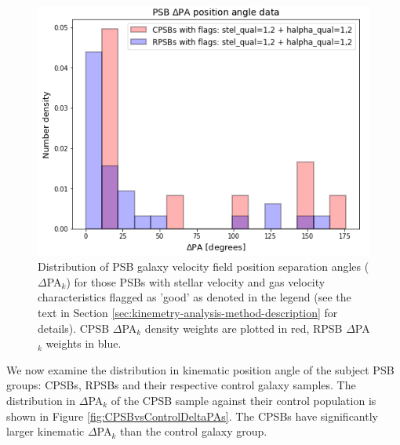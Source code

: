 \begin{figure}
    \centering
    \includegraphics[width=\columnwidth]{images/JupyterPlots/Dist-Delta-PA-All-GoodFlags.png}
    \caption[Distribution of PSB stellar and gas velocity field position angles]{Distribution of PSB galaxy velocity field position separation angles ($\Delta$PA$_{k}$) for those PSBs with stellar velocity and gas velocity characteristics flagged as 'good' as denoted in the legend (see the text in Section \ref{sec:kinemetry-analysis-method-description} for details). CPSB $\Delta$PA$_{k}$ density weights are plotted in red, RPSB $\Delta$PA$_{k}$ weights in blue.}
    \label{fig:deltaPAdistribution}
\end{figure}

We now examine the distribution in kinematic position angle of the subject PSB groups: CPSBs, RPSBs and their respective control galaxy samples. The distribution in $\Delta$PA$_{k}$ of the CPSB sample against their control population is shown in Figure \ref{fig:CPSBvsControlDeltaPAs}. The CPSBs have significantly larger kinematic $\Delta$PA$_{k}$ than the control galaxy group.

